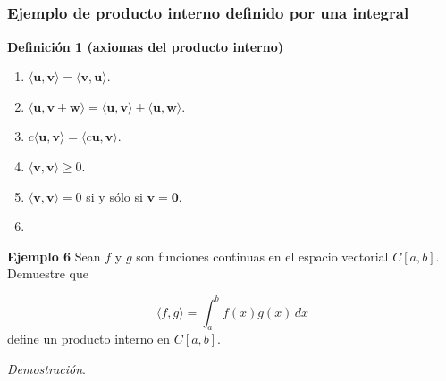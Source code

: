 
\subsection{}

\begin{frame}\frametitle{Ejemplo de producto interno definido por una integral}
	
	\begin{block}{\textbf{Definición 1 (axiomas del producto interno)}}	
		\begin{multicols}{2}		
			\begin{enumerate}			
				\justifying
				\item[\labelname{$a$}] $\langle \mathbf{u}, \mathbf{v}\rangle = \langle \mathbf{v}, \mathbf{u}\rangle$. \\%
				\item[\labelname{$b$}] $\langle \mathbf{u}, \mathbf{v}+\mathbf{w}\rangle 
				= \langle \mathbf{u}, \mathbf{v}\rangle + \langle \mathbf{u}, \mathbf{w}\rangle$. \\%
				\item[\labelname{$c$}] $c\langle \mathbf{u}, \mathbf{v}\rangle = \langle c\mathbf{u}, \mathbf{v}\rangle$.\\
				\columnbreak
				\item[\labelname{$d$}] $\langle \mathbf{v}, \mathbf{v}\rangle \geq 0 $. 
				\item[\labelname{$e$}] $\langle \mathbf{v}, \mathbf{v}\rangle = 0 $ si y sólo si $\mathbf{v}=\mathbf{0}$. 
				\item[]
			\end{enumerate}		
		\end{multicols}
		
	\end{block}
	
	\begin{ej}{\textbf{Ejemplo 6}}\justifying
		Sean $f$ y $g$ son funciones continuas en el espacio vectorial $C[a,b]$. Demuestre que 

		\vspace{-4mm}
		\[
		\langle f, g\rangle = \int_{a}^{b} \!f(x)g(x)\,dx
		\]		
		define un producto interno en $C[a,b]$.
	\end{ej}
	\textit{Demostración}.
	
\end{frame}

